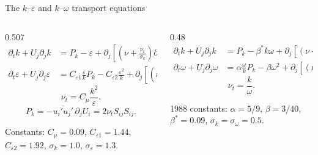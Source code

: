 \documentclass[aspectratio=169,11pt]{beamer}
\newcommand{\mean}[1]{\overline{#1}}
\begin{document}
\begin{frame}{The $k$--$\varepsilon$ and $k$--$\omega$ transport equations}
\footnotesize
\begin{columns}[T,onlytextwidth]
\begin{column}{0.507\textwidth}
 
\begin{align*}
  \partial_t k + U_j\partial_j k &= P_k-\varepsilon
    +\partial_j\!\left[\left(\nu+\tfrac{\nu_t}{\sigma_k}\right)\partial_j k\right],\\
  \partial_t \varepsilon + U_j\partial_j \varepsilon &= C_{\varepsilon1}\frac{\varepsilon}{k}P_k
    -C_{\varepsilon2}\frac{\varepsilon^{2}}{k}
    +\partial_j\!\left[\left(\nu+\tfrac{\nu_t}{\sigma_\varepsilon}\right)\partial_j \varepsilon\right],
\end{align*}
\vspace{-1.1em}
\[
  \nu_t=C_\mu\frac{k^{2}}{\varepsilon}.
\]
\vspace{-1.0em}
\[
  P_k=-\mean{u_i'u_j'}\,\partial_j U_i=2\nu_t S_{ij}S_{ij}.
\]
\vspace{-0.6em}

Constants: $C_\mu=0.09$, $C_{\varepsilon1}=1.44$, $C_{\varepsilon2}=1.92$, $\sigma_k=1.0$, $\sigma_\varepsilon=1.3$.
\end{column}
\begin{column}{0.48\textwidth}
 
\begin{align*}
  \partial_t k + U_j\partial_j k &= P_k-\beta^{*}k\omega
    +\partial_j\!\left[\left(\nu+\sigma_k\nu_t\right)\partial_j k\right],\\
  \partial_t \omega + U_j\partial_j \omega &= \alpha\frac{\omega}{k}P_k-\beta\omega^{2}
    +\partial_j\!\left[\left(\nu+\sigma_\omega\nu_t\right)\partial_j \omega\right],
\end{align*}
\vspace{-1.1em}
\[
  \nu_t=\frac{k}{\omega}.
\]
\vspace{-0.6em}

1988 constants: $\alpha=5/9$, $\beta=3/40$, $\beta^{*}=0.09$, $\sigma_k=\sigma_\omega=0.5$.

\end{column}
\end{columns}
\end{frame}
\end{document}

